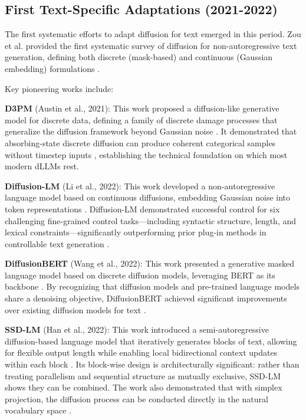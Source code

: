 \documentclass[11pt]{article}
\begin{document}
\subsection{First Text-Specific Adaptations (2021-2022)}

The first systematic efforts to adapt diffusion for text emerged in this period. Zou et al. provided the first systematic survey of diffusion for non-autoregressive text generation, defining both discrete (mask-based) and continuous (Gaussian embedding) formulations \cite{zou2023survey}.

Key pioneering works include:

\textbf{D3PM} (Austin et al., 2021): This work proposed a diffusion-like generative model for discrete data, defining a family of discrete damage processes that generalize the diffusion framework beyond Gaussian noise \cite{austin2021d3pm}. It demonstrated that absorbing-state discrete diffusion can produce coherent categorical samples without timestep inputs \cite{austin2021d3pm}, establishing the technical foundation on which most modern dLLMs rest.

\textbf{Diffusion-LM} (Li et al., 2022): This work developed a non-autoregressive language model based on continuous diffusions, embedding Gaussian noise into token representations \cite{li2022diffusion, tseng2025diffusion}. Diffusion-LM demonstrated successful control for six challenging fine-grained control tasks---including syntactic structure, length, and lexical constraints---significantly outperforming prior plug-in methods in controllable text generation \cite{li2022diffusion}.

\textbf{DiffusionBERT} (Wang et al., 2022): This work presented a generative masked language model based on discrete diffusion models, leveraging BERT as its backbone \cite{wang2023diffusionbert}. By recognizing that diffusion models and pre-trained language models share a denoising objective, DiffusionBERT achieved significant improvements over existing diffusion models for text \cite{wang2023diffusionbert}.

\textbf{SSD-LM} (Han et al., 2022): This work introduced a semi-autoregressive diffusion-based language model that iteratively generates blocks of text, allowing for flexible output length while enabling local bidirectional context updates within each block \cite{han2023ssdlm}. Its block-wise design is architecturally significant: rather than treating parallelism and sequential structure as mutually exclusive, SSD-LM shows they can be combined. The work also demonstrated that with simplex projection, the diffusion process can be conducted directly in the natural vocabulary space \cite{han2023ssdlm}.
\end{document}

